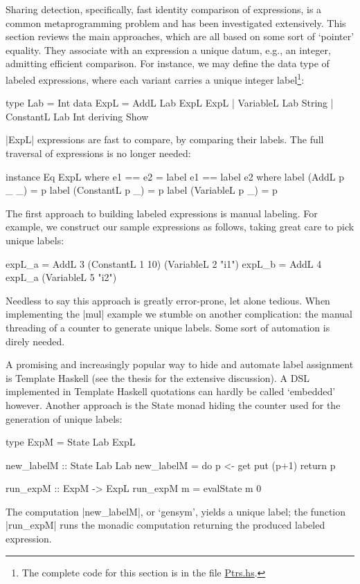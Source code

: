 \documentclass[submission,copyright,creativecommons]{eptcs}
\begin{document}
Sharing detection, specifically, fast identity comparison of
expressions, is a common metaprogramming problem and has been
investigated extensively. This section reviews the main approaches,
which are all based on some sort of `pointer' equality. They associate
with an expression a unique datum, e.g., an integer, admitting
efficient comparison. For instance, we may define the data type of
labeled expressions, where each variant carries a unique integer
label\footnote{The complete code for this section is in the file
  \url{Ptrs.hs}.}:
\begin{code}
type Lab = Int
data ExpL
   = AddL Lab ExpL ExpL
   | VariableL Lab String
   | ConstantL Lab Int
   deriving Show
\end{code}
|ExpL| expressions are fast to compare, by comparing their
labels. The full traversal of expressions is no longer needed:
\begin{code}
instance Eq ExpL where
    e1 == e2 = label e1 == label e2
     where
     label (AddL p _ _)    = p
     label (ConstantL p _) = p
     label (VariableL p _) = p
\end{code}

The first approach to building labeled expressions is manual
labeling. For example, we construct our sample expressions as follows,
taking great care to pick unique labels:
\begin{code}
expL_a = AddL 3 (ConstantL 1 10) (VariableL 2 "i1")
expL_b = AddL 4 expL_a (VariableL 5 "i2")
\end{code}
Needless to say this approach is greatly error-prone, let alone
tedious. When implementing the |mul| example we stumble on another
complication: the manual threading of a counter to generate unique labels.
Some sort of automation is direly needed.

A promising and increasingly popular way to hide and automate label
assignment is Template Haskell (see the thesis \cite{acosta-hardware}
for the extensive discussion). A DSL implemented in Template
Haskell quotations can hardly be called `embedded' however. Another
approach is the State monad hiding the counter used for the generation
of unique labels:
\begin{code}
type ExpM = State Lab ExpL

new_labelM :: State Lab Lab
new_labelM = do
  p <- get
  put (p+1)
  return p

run_expM :: ExpM -> ExpL
run_expM m = evalState m 0
\end{code}
The computation |new_labelM|, or `gensym', yields a
unique label; the function |run_expM| runs the monadic computation returning
the produced labeled expression.
\end{document}
